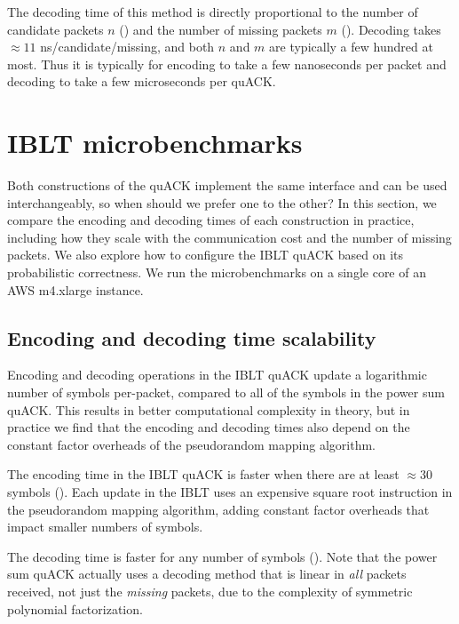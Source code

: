 The decoding time of this method is directly proportional to the number of
candidate packets $n$ ()
and the number of missing packets $m$ ().
Decoding takes $\approx 11$ ns/candidate/missing, and both $n$ and $m$ are
typically a few hundred at most.
Thus it is typically for encoding to take a few nanoseconds per packet and
decoding to take a few microseconds per quACK.

\section{IBLT microbenchmarks}
\label{sec:quack:iblt-microbenchmarks}

Both constructions of the quACK implement the same interface and can be used
interchangeably, so when should we prefer one to the other? In this section, we
compare the encoding and decoding times of each construction in practice,
including how they scale with the communication cost and the number of missing
packets. We also explore how to configure the IBLT quACK based on its
probabilistic correctness. We run the microbenchmarks on a single core of an
AWS m4.xlarge instance.

\subsection{Encoding and decoding time scalability}
\label{sec:quack:iblt-microbenchmarks:scalability}



Encoding and decoding operations in the IBLT quACK update a logarithmic number
of symbols per-packet, compared to all of the symbols in the power sum quACK.
This results in better computational complexity in theory, but in practice we
find that the encoding and decoding times also depend on the constant factor
overheads of the pseudorandom mapping algorithm.

The encoding time in the IBLT quACK is faster when there are at least
$\approx\!30$ symbols ().
Each update in the IBLT uses an expensive square root instruction in the
pseudorandom mapping algorithm, adding constant factor overheads that impact
smaller numbers of symbols.

The decoding time is faster for any number of symbols
().
Note that the power sum quACK actually uses a decoding method that is linear
in \textit{all} packets received, not just the \textit{missing} packets, due to
the complexity of symmetric polynomial factorization.

